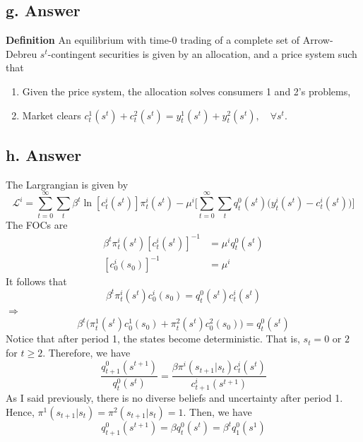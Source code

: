 \documentclass[11pt]{article}
\theoremstyle{definition}
\theoremstyle{boldtitle} %
\numberwithin{equation}{section}
\numberwithin{figure}{section}
\numberwithin{table}{section}
\begin{document}
\subsection{g. Answer} 
\noindent \textbf{Definition}
An equilibrium with time-0 trading of a complete set of Arrow-Debreu $s^t$-contingent securities is given by 
an allocation, and a price system such that 
\begin{enumerate}
    \item Given the price system, the allocation solves consumers 1 and 2's problems,
    \item Market clears $c^1_t(s^t) + c^2_t(s^t) = y^1_t(s^t) + y^2_t(s^t), \quad \forall s^t$.
\end{enumerate}


\subsection{h. Answer} 
The Largrangian is given by 
\[
\mathcal{L}^i = \sum_{t=0}^\infty \sum_t \beta^t \ln [c_t^i(s^t)] \pi^i_t(s^t) 
- \mu^i \bigg[\sum_{t=0}^\infty \sum_t q^0_t(s^t) \bigg(y_t^i(s^t) - c_t^i(s^t) \bigg) \bigg]
\]
The FOCs are 
\begin{align*}
   \beta^t \pi^i_t(s^t) [c_t^i(s^t)]^{-1} & = \mu^i q_t^0(s^t) \\
   [c_0^i(s_0)]^{-1} & = \mu^i
\end{align*}
It follows that 
\[
\beta^t \pi^i_t(s^t) c_0^i(s_0) = q_t^0(s^t) c_t^i(s^t)
\]
\noindent $\Rightarrow$
\[
\beta^t \bigg(\pi^1_t(s^t) c_0^1(s_0) + \pi^2_t(s^t) c_0^2(s_0) \bigg) = q_t^0(s^t)
\]
Notice that after period 1, the states become deterministic.
That is, $s_t = 0$ or $2$ for $t \geq 2$.
Therefore, we have 
\[
\frac{q^0_{t+1}(s^{t+1})
}{q^0_{t}(s^{t})} = \frac{\beta \pi^i (s_{t+1}| s_t) c^i_t(s^t)}{c^i_{t+1}(s^{t+1})}
\]
As I said previously, there is no diverse beliefs and uncertainty after period 1.
Hence, $\pi^1(s_{t+1}|s_t) = \pi^2(s_{t+1}|s_t) = 1$.
Then, we have 
\[
q^0_{t+1}(s^{t+1}) = \beta q^0_{t}(s^{t}) = \beta^t q^0_{1}(s^1)
\]



\end{document}
